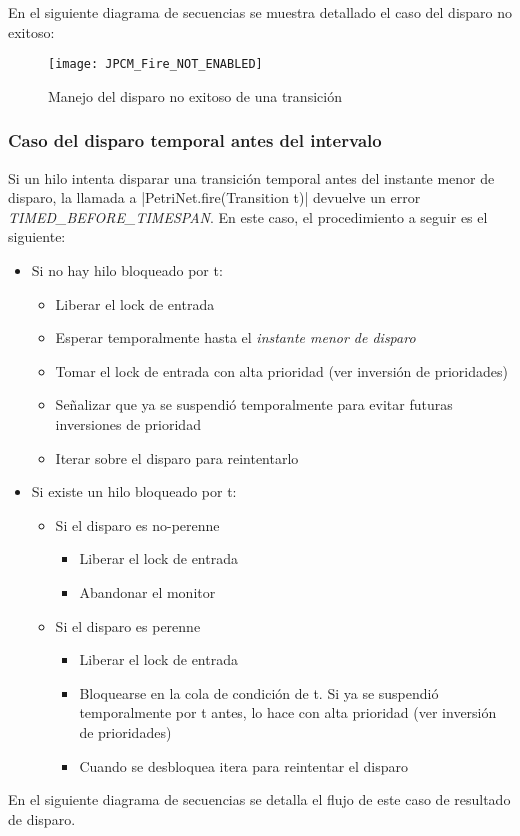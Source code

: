En el siguiente diagrama de secuencias se muestra detallado el caso del disparo
no exitoso:

\begin{figure}[H]
  \hspace*{-2cm}
  \texttt{[image: JPCM\_Fire\_NOT\_ENABLED]}
  \caption{Manejo del disparo no exitoso de una transición}
  \label{fig:JPCM_Fire_NOT_ENABLED}
\end{figure}

\subsubsection*{Caso del disparo temporal antes del intervalo}
Si un hilo intenta disparar una transición temporal antes del instante menor de
disparo, la llamada a |PetriNet.fire(Transition t)| devuelve un error
\textit{TIMED\_BEFORE\_TIMESPAN}.
En este caso, el procedimiento a seguir es el siguiente:
\begin{itemize}
  \item Si no hay hilo bloqueado por t:
  \begin{itemize}
    \item Liberar el lock de entrada
    \item Esperar temporalmente hasta el \textit{instante menor de disparo}
    \item Tomar el lock de entrada con alta prioridad {\color{red}(ver
    inversión de prioridades)}
    \item Señalizar que ya se suspendió temporalmente para evitar futuras
    inversiones de prioridad
    \item Iterar sobre el disparo para reintentarlo
  \end{itemize}
  \item Si existe un hilo bloqueado por t:
  \begin{itemize}
    \item Si el disparo es no-perenne
    \begin{itemize}
      \item Liberar el lock de entrada
      \item Abandonar el monitor
    \end{itemize}
    \item Si el disparo es perenne
    \begin{itemize}
      \item Liberar el lock de entrada
      \item Bloquearse en la cola de condición de t. Si ya se suspendió
      temporalmente por t antes, lo hace con alta prioridad {\color{red}(ver
      inversión de prioridades)}
      \item Cuando se desbloquea itera para reintentar el disparo
    \end{itemize}
  \end{itemize}
\end{itemize}
En el siguiente diagrama de secuencias se detalla el flujo de este caso de resultado de disparo.


